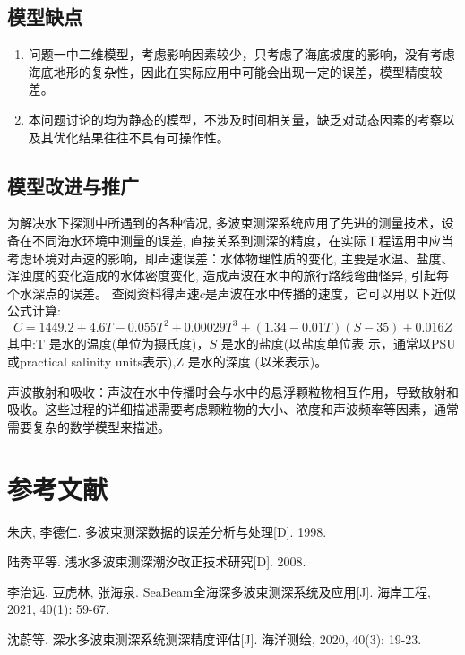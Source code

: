 \documentclass[withoutpreface,bwprint]{cumcmthesis} %
\begin{document}
    \subsection{模型缺点}
    \begin{enumerate}
        \item 问题一中二维模型，考虑影响因素较少，只考虑了海底坡度的影响，没有考虑海底地形的复杂性，因此在实际应用中可能会出现一定的误差，模型精度较差。
        \item 本问题讨论的均为静态的模型，不涉及时间相关量，缺乏对动态因素的考察以及其优化结果往往不具有可操作性。
    \end{enumerate} 
    \subsection{模型改进与推广}
    为解决水下探测中所遇到的各种情况, 多波束测深系统应用了先进的测量技术，设备在不同海水环境中测量的误差, 直接关系到测深的精度，在实际工程运用中应当考虑环境对声速的影响，即声速误差：水体物理性质的变化, 主要是水温、盐度、浑浊度的变化造成的水体密度变化, 造成声波在水中的旅行路线弯曲怪异, 引起每个水深点的误差。
    查阅资料得声速$c$是声波在水中传播的速度，它可以用以下近似公式计算:
    \begin{equation}
        C=1449.2+4.6 T-0.055 T^2+0.00029 T^3+(1.34-0.01 T)(S-35)+0.016 Z
    \end{equation}
    其中:$\mathrm{T}$ 是水的温度(单位为摄氏度)，$S$ 是水的盐度(以盐度单位表  示，通常以PSU或practical salinity units表示),$\mathrm{Z}$ 是水的深度 (以米表示)。

    声波散射和吸收：声波在水中传播时会与水中的悬浮颗粒物相互作用，导致散射和吸收。这些过程的详细描述需要考虑颗粒物的大小、浓度和声波频率等因素，通常需要复杂的数学模型来描述。


    \section{参考文献}
    \begin{thebibliography}{99} %

         朱庆, 李德仁. 多波束测深数据的误差分析与处理[D]. 1998.
    
         陆秀平等. 浅水多波束测深潮汐改正技术研究[D]. 2008.
    
         李治远, 豆虎林, 张海泉. SeaBeam全海深多波束测深系统及应用[J]. 海岸工程, 2021, 40(1): 59-67.
    
         沈蔚等. 深水多波束测深系统测深精度评估[J]. 海洋测绘, 2020, 40(3): 19-23.
    
    \end{thebibliography}  
    
\end{document}
